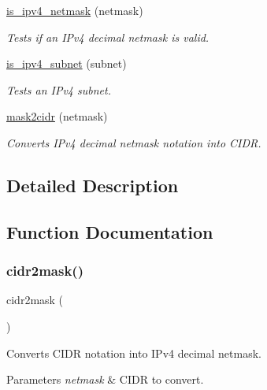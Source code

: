 \begin{DoxyCompactItemize}
\hyperlink{group__network_ga285bf1c0fa821c715d3dcfb730fb6c25}{is\+\_\+ipv4\+\_\+netmask} (netmask)
\begin{DoxyCompactList}\small\item\em Tests if an I\+Pv4 decimal netmask is valid. \end{DoxyCompactList}\item 
\hyperlink{group__network_gaf6be413099165a8bb76734dc07a874e7}{is\+\_\+ipv4\+\_\+subnet} (subnet)
\begin{DoxyCompactList}\small\item\em Tests an I\+Pv4 subnet. \end{DoxyCompactList}\item 
\hyperlink{group__network_ga807b7f569c898e32f4ce207a8209a584}{mask2cidr} (netmask)
\begin{DoxyCompactList}\small\item\em Converts I\+Pv4 decimal netmask notation into C\+I\+DR. \end{DoxyCompactList}\end{DoxyCompactItemize}


\subsection{Detailed Description}


\subsection{Function Documentation}
\mbox{\label{group__network_ga29eb87466a05fafa3923b9eebd5448fe}} 
\subsubsection{\texorpdfstring{cidr2mask()}{cidr2mask()}}
{\footnotesize\ttfamily cidr2mask (\begin{DoxyParamCaption}\item[{netmask}]{ }\end{DoxyParamCaption})}



Converts C\+I\+DR notation into I\+Pv4 decimal netmask. 


\begin{DoxyParams}{Parameters}
{\em netmask} & C\+I\+DR to convert. \\
\hline
\end{DoxyParams}

